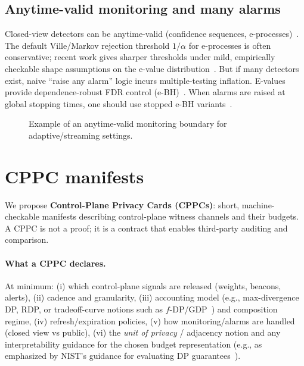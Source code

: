 \documentclass[11pt]{article}
\begin{document}
\subsection{Anytime-valid monitoring and many alarms}
Closed-view detectors can be anytime-valid (confidence sequences, e-processes)~\cite{howard2021confseq,ramdas2024evalues}.
The default Ville/Markov rejection threshold $1/\alpha$ for e-processes is often conservative; recent work gives sharper thresholds under mild, empirically checkable shape assumptions on the e-value distribution~\cite{blierwong2026thresholds}.
But if many detectors exist, naive ``raise any alarm'' logic incurs multiple-testing inflation.
E-values provide dependence-robust FDR control (e-BH)~\cite{wang2022ebh}.
When alarms are raised at global stopping times, one should use stopped e-BH variants~\cite{wang2025sebH}.

\begin{figure}[t]
  \centering
  \caption{Example of an anytime-valid monitoring boundary for adaptive/streaming settings.}
\end{figure}


\section{CPPC manifests}
\label{sec:cppc}

We propose \textbf{Control-Plane Privacy Cards (CPPCs)}: short, machine-checkable manifests describing control-plane witness channels and their budgets.
A CPPC is not a proof; it is a contract that enables third-party auditing and comparison.

\paragraph{What a CPPC declares.}
At minimum:
(i) which control-plane signals are released (weights, beacons, alerts),
(ii) cadence and granularity,
(iii) accounting model (e.g., max-divergence DP, RDP, or tradeoff-curve notions such as $f$-DP/GDP~\cite{dong2022gdp}) and composition regime,
(iv) refresh/expiration policies,
(v) how monitoring/alarms are handled (closed view vs public),
(vi) the \emph{unit of privacy} / adjacency notion and any interpretability guidance for the chosen budget representation (e.g., as emphasized by NIST's guidance for evaluating DP guarantees~\cite{nist_sp800_226}).
\end{document}
